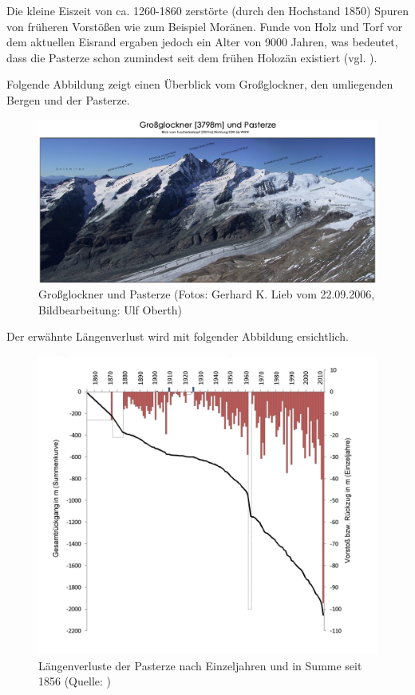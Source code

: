 \documentclass[12pt,a4paper]{article}
\begin{document}
Die kleine Eiszeit von ca. 1260-1860 zerstörte (durch den Hochstand 1850) Spuren von früheren Vorstößen wie zum Beispiel Moränen. Funde von Holz und Torf vor dem aktuellen Eisrand ergaben jedoch ein Alter von 9000 Jahren, was bedeutet, dass die Pasterze schon zumindest seit dem frühen Holozän existiert (vgl. \cite[24]{Pasterze}).

Folgende Abbildung zeigt einen Überblick vom Großglockner, den umliegenden Bergen und der Pasterze. 
\begin{figure}[H]
\centering
\includegraphics[width=1\textwidth]{pictures/Pasterze_Beschriftung_bw.jpg}
\caption{Großglockner und Pasterze (Fotos: Gerhard K. Lieb vom 22.09.2006, Bildbearbeitung: Ulf Oberth)}
\label{fig:Grossglockner und Pasterze}
\end{figure}
\pagebreak
Der erwähnte Längenverlust wird mit folgender Abbildung ersichtlich.

\begin{figure}[H]
\centering
\includegraphics[width=1\textwidth]{pictures/pasterze_laengenaenderung.jpg}
\caption{Längenverluste der Pasterze nach Einzeljahren und in Summe seit 1856  (Quelle:  \cite{LaengenaenderungPasterze})}
\label{fig:Längenverluste der Pasterze}
\end{figure}
\end{document}
